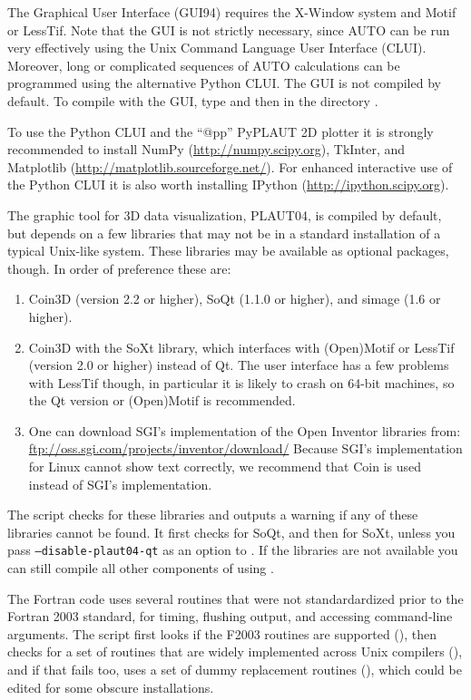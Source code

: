 \documentclass[12pt]{report}
\begin{document}
The Graphical User Interface (GUI94) requires the {\cal X-Window} system
and {\cal Motif} or {\cal LessTif}.
Note that the GUI is not strictly necessary, since {\cal AUTO} can be
run very effectively using the Unix Command Language User Interface (CLUI).
Moreover, long or complicated sequences of {\cal AUTO} calculations can
be programmed using the alternative Python CLUI. 
The GUI is not compiled by default. To compile
\AUTO with the GUI, type 
and then  in the directory .

To use the Python CLUI and the ``@pp'' {\cal PyPLAUT} 2D plotter it
is strongly recommended to install NumPy
(\url{http://numpy.scipy.org}), TkInter, and
Matplotlib (\url{http://matplotlib.sourceforge.net/}).
For enhanced interactive use of the Python CLUI it is also worth
installing IPython (\url{http://ipython.scipy.org}).

The graphic tool for 3D \AUTO data visualization, {\cal PLAUT04}, is
compiled by default, but depends on a few libraries that may not be
in a standard installation of a typical Unix-like
system. These libraries may be available as optional packages,
though. In order of preference these are:
\begin{enumerate}
\item
Coin3D (version 2.2 or higher), SoQt (1.1.0 or higher), and simage (1.6 or higher).
\item
Coin3D with the SoXt library, which interfaces with (Open)Motif or
LessTif (version 2.0 or higher) instead of Qt. The user interface has
a few problems with LessTif though, in particular it is likely to
crash on 64-bit machines, so the Qt version or (Open)Motif is
recommended.
\item
One can download SGI's implementation of the
Open Inventor libraries from:
\url{ftp://oss.sgi.com/projects/inventor/download/}
Because SGI's implementation for Linux cannot show text correctly, 
we recommend that Coin is used instead of SGI's implementation. 
\end{enumerate}

The  script checks
for these libraries and outputs a warning if any of these libraries
cannot be found. It first checks for SoQt, and then for SoXt, unless
you pass {\tt --disable-plaut04-qt} as an option to .
If the libraries are not available you can still compile
all other components of \AUTO using .

The Fortran code uses several routines that were not standardardized
prior to the Fortran 2003 standard, for timing, flushing output, and
accessing command-line arguments. The  script first looks if
the F2003 routines are supported (), then checks
for a set of routines that are widely implemented across Unix
compilers (), and if that fails too, uses a set of
dummy replacement routines (), which could be
edited for some obscure installations.
\end{document}
